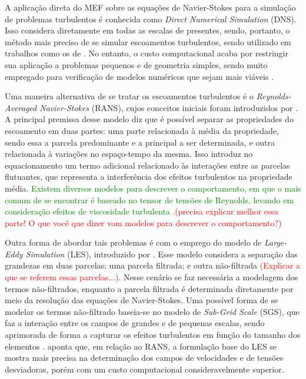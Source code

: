 A aplicação direta do MEF sobre as equações de Navier-Stokes para a simulação de problemas turbulentos é conhecida como \textit{Direct Numerical Simulation} (DNS). Isso considera diretamente em todas as escalas de presentes, sendo, portanto, o método mais preciso de se simular escoamentos turbulentos, sendo utilizado em trabalhos como os de . No entanto, o custo computacional acaba por restringir sua aplicação a problemas pequenos e de geometria simples, sendo muito empregado para verificação de modelos numéricos que sejam mais viáveis \cite{piomelli1999large,yokokawa200216}.

Uma maneira alternativa de se tratar os escoamentos turbulentos é o \textit{Reynolds-Averaged Navier-Stokes} (RANS), cujos conceitos iniciais foram introduzidos por . A principal premissa desse modelo diz que é possível separar as propriedades do escoamento em duas partes: uma parte relacionada à média da propriedade, sendo essa a parcela predominante e a principal a ser determinada, e outra relacionada à variações no espaço-tempo da mesma. Isso introduz no equacionamento um termo adicional relacionado às interações entre as parcelas flutuantes, que representa a interferência dos efeitos turbulentos na propriedade média. \textcolor{green}{Existem diversos modelos para descrever o comportamento, em que o mais comum de se encontrar é baseado no tensor de tensões de Reynolds, levando em consideração efeitos de viscosidade turbulenta \cite{piomelli1999large,alfonsi2009reynolds,bazilevs2010large,ling2015evaluation}.}\textcolor{red}{(precisa explicar melhor essa parte! O que você que dizer vom modelos para descrever o comportamento?)}

Outra forma de abordar tais problemas é com o emprego do modelo de \textit{Large-Eddy Simulation} (LES), introduzido por . Esse modelo considera a separação das grandezas em duas parcelas: uma parcela filtrada; e outra não-filtrada \textcolor{red}{(Explicar a que se referem essas parcelas...)}. Nesse cenário se faz necessária a modelagem dos termos não-filtrados, enquanto a parcela filtrada é determinada diretamente por meio da resolução das equações de Navier-Stokes. Uma possível forma de se modelar os termos não-filtrado baseia-se no modelo de \textit{Sub-Grid Scale} (SGS), que faz a interação entre os campos de grandes e de pequenas escalas, sendo aprimorada de forma a capturar os efeitos turbulentos em função do tamanho dos elementos \cite{ghosal1995basic,hughes2000large,moeng2015large}.
 aponta que, em relação ao RANS, a formulação base do LES se mostra mais precisa na determinação dos campos de velocidades e de tensões desviadoras, porém com um custo computacional consideravelmente superior.

